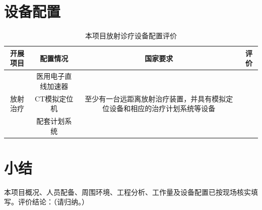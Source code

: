 \section{设备配置}

\begin{table}[H]
\centering
\caption{本项目放射诊疗设备配置评价}
\label{tab:kp-linac-equip}
\begin{tabular}{|c|c|c|c|}
\hline
开展项目 & 配置情况 & 国家要求 & 评价 \\
\hline
\multirow{3}{*}{放射治疗}
& 医用电子直线加速器 & \multirow{3}{*}{至少有一台远距离放射治疗装置，并具有模拟定位设备和相应的治疗计划系统等设备} &  \\
\cline{2-2}\cline{4-4}
& CT模拟定位机 &  &  \\
\cline{2-2}\cline{4-4}
& 配套计划系统 &  &  \\
\hline
\end{tabular}
\end{table}

\section{小结}

本项目概况、人员配备、周围环境、工程分析、工作量及设备配置已按现场核实填写。评价结论：（请归纳。）
